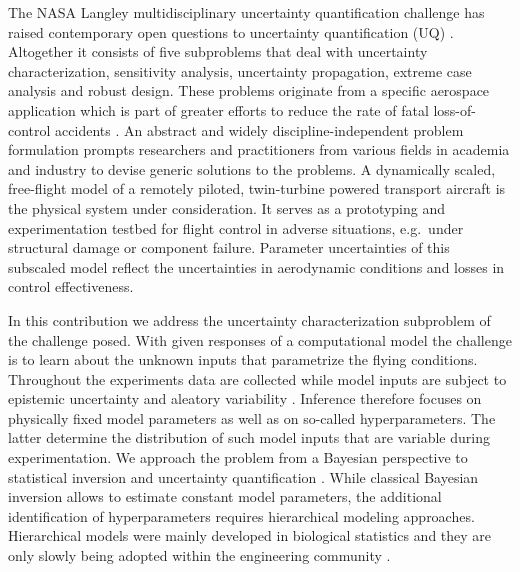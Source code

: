 The NASA Langley multidisciplinary uncertainty quantification challenge has raised contemporary open questions to uncertainty quantification (UQ) \cite{NASA:Crespo2014:Proc,NASA:Crespo2013:FAQ:URL}.
Altogether it consists of five subproblems that deal with uncertainty characterization, sensitivity analysis, uncertainty propagation, extreme case analysis and robust design.
These problems originate from a specific aerospace application which is part of greater efforts to reduce the rate of fatal loss-of-control accidents \cite{NASA:Foster2005:Proc,NASA:Jordan2008:Proc,NASA:Crespo2012}.
An abstract and widely discipline-independent problem formulation prompts researchers and practitioners from various fields in academia and industry to devise generic solutions to the problems.
A dynamically scaled, free-flight model of a remotely piloted, twin-turbine powered transport aircraft is the physical system under consideration.
It serves as a prototyping and experimentation testbed for flight control in adverse situations, e.g.\ under structural damage or component failure.
Parameter uncertainties of this subscaled model reflect the uncertainties in aerodynamic conditions and losses in control effectiveness.
\par %
In this contribution we address the uncertainty characterization subproblem of the challenge posed.
With given responses of a computational model the challenge is to learn about the unknown inputs that parametrize the flying conditions.
Throughout the experiments data are collected while model inputs are subject to epistemic uncertainty and aleatory variability \cite{Uncertainty:Faber2005,Uncertainty:Kiureghian2009}.
Inference therefore focuses on physically fixed model parameters as well as on so-called hyperparameters.
The latter determine the distribution of such model inputs that are variable during experimentation.
We approach the problem from a Bayesian perspective to statistical inversion and uncertainty quantification \cite{Bayesian:Hadidi2008,Bayesian:Beck2010,Bayesian:Stuart2010}.
While classical Bayesian inversion allows to estimate constant model parameters, the additional identification of hyperparameters requires hierarchical modeling approaches.
Hierarchical models were mainly developed in biological statistics \cite{Multilevel:Davidian2003,Multilevel:Banks2012}
and they are only slowly being adopted within the engineering community \cite{Multilevel:Rocquigny2009,Multilevel:Celeux2010,Multilevel:Barbillon2011}.
